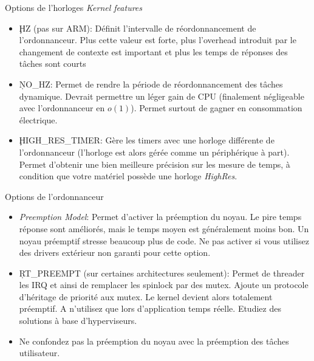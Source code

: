 \begin{frame}[fragile=singleslide]{Options de l'horloges}
  \emph{Kernel features}
  \begin{itemize}
  \item \c{HZ} (pas sur ARM): Définit l'intervalle de réordonnancement
    de l'ordonnanceur.   Plus cette valeur est  forte, plus l'overhead
    introduit par le changement de  contexte est important et plus les
    temps de réponses des tâches sont courts
  \item \c{NO_HZ}: Permet de rendre la période de réordonnancement des
    tâches  dynamique.   Devrait  permettre  un  léger   gain  de  CPU
    (finalement  négligeable avec  l'ordonnanceur  en $o(1)$).  Permet
    surtout de gagner en consommation électrique.
  \item   \c{HIGH_RES_TIMER}:  Gère  les   timers  avec   une  horloge
    différente de  l'ordonnanceur (l'horloge  est alors gérée  comme un
    périphérique  à  part).    Permet  d'obtenir  une  bien  meilleure
    précision sur les mesure de  temps, à condition que votre matériel
    possède une horloge \emph{HighRes}.
  \end{itemize}
\end{frame}

\begin{frame}[fragile=singleslide]{Options de l'ordonnanceur}
  \begin{itemize}
  \item  \emph{Preemption Model}:  Permet d'activer  la  préemption du
    noyau. Le pire  temps réponse sont améliorés, mais  le temps moyen
    est généralement  moins bon.  Un noyau  préemptif stresse beaucoup
    plus  de  code.  Ne  pas  activer  si  vous utilisez  des  drivers
    extérieur non garanti pour cette option.
  \item \c{RT_PREEMPT} (sur certaines architectures seulement): Permet
    de threader  les IRQ  et ainsi de  remplacer les spinlock  par des
    mutex.  Ajoute un protocole  d'héritage de priorité aux mutex.  Le
    kernel devient alors totalement  préemptif.  A n'utilisez que lors
    d'application  temps   réelle.   Etudiez  des   solutions  à  base
    d'hyperviseurs.
  \item Ne confondez pas la préemption du noyau avec la préemption des
    tâches utilisateur.
  \end{itemize}
\end{frame}

